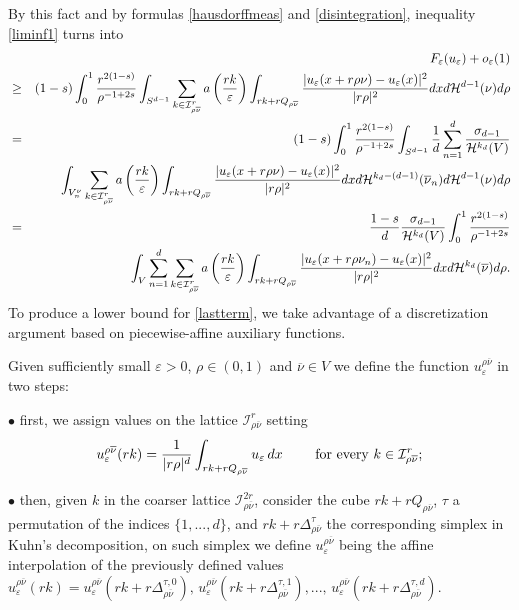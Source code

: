\documentclass[11pt,a4paper,reqno]{amsart}
\theoremstyle{plain}
\theoremstyle{definition}
\newcommand\e{\varepsilon}
\theoremstyle{remark}
\begin{document}
By this fact and by formulas \eqref{hausdorffmeas} and \eqref{disintegration}, inequality \eqref{liminf1} turns into
\begin{eqnarray} && \nonumber
\hskip-0.8cm F_\e(u_\e)+o_\e(1) \\ \nonumber
{\hskip-1.5cm} &\geq&(1-s) \int_0^1 \frac{r^{2(1-s)}}{\rho^{-1+2s}} \int_{S^{d-1}} \sum_{k\in \mathcal{I}^r_{\rho\overline{\nu}}} a\left(\frac{rk}{\e}\right)\int_{rk+rQ_{\rho\overline{\nu}}} \frac{|u_\e(x+r\rho\nu)-u_\e(x)|^2}{|r\rho|^2} dxd\mathcal{H}^{d-1}(\nu) d\rho\\ \nonumber
\hskip-1.5cm&=& (1-s) \int_0^1  \frac{r^{2(1-s)}}{\rho^{-1+2s}} \int_{S^{d-1}} \frac{1}{d} \sum_{n=1}^d \frac{\sigma_{d-1}}{\mathcal{H}^{k_d}(V)} \\ \nonumber
&& \qquad \int_{V_n^\nu} \sum_{k\in \mathcal{I}^r_{\rho \overline{\nu}}} a\left(\frac{rk}{\e}\right)\int_{rk+rQ_{\rho\overline{\nu}}}\frac{|u_\e(x+r\rho\nu)-u_\e(x)|^2}{|r\rho|^2} dx d\mathcal{H}^{k_d-(d-1)}(\overline{\nu}_n) d\mathcal{H}^{d-1}(\nu) d\rho \\ \nonumber
&=& \frac{1-s}{d} \frac{\sigma_{d-1}}{\mathcal{H}^{k_d}(V)} \int_0^1  \frac{r^{2(1-s)}}{\rho^{-1+2s}}  \\ \label{lastterm}
&& \qquad \qquad  \int_V  \sum_{n=1}^d \sum_{k\in \mathcal{I}^r_{\rho \overline{\nu}}}  a\left(\frac{rk}{\e}\right) \int_{rk+rQ_{\rho\overline{\nu}}}\frac{|u_\e(x+r\rho\nu_n)-u_\e(x)|^2}{|r\rho|^2} dx d\mathcal{H}^{k_d}(\overline{\nu}) d\rho.
\end{eqnarray}
To produce a lower bound for \eqref{lastterm}, we take advantage of a discretization argument based on piecewise-affine  auxiliary functions.

Given sufficiently small $\e>0$, $\rho\in (0,1)$ and $\overline{\nu}\in V$ we define the function $u_\e^{\rho\overline{\nu}}$ in two steps:

    $\bullet$ first, we assign values on the lattice $\mathcal{I}^r_{\rho\overline{\nu}}$ setting
    \[
    u_\e^{\rho\overline{\nu}}(rk)= \displaystyle \frac{1}{|r\rho|^d}\int_{rk+rQ_{\rho\overline{\nu}}} u_\e\,dx \qquad \hbox{ for every } k\in \mathcal{I}^r_{\rho\overline{\nu}};
    \] 
    
    $\bullet$ then, given $k$ in the coarser lattice $\mathcal{I}^{2r}_{\rho\overline{\nu}}$, consider the cube $rk+rQ_{\rho\overline{\nu}}$, $\tau$ 
a permutation of the indices $\{1,...,d\}$, and $rk+r\Delta^\tau_{\rho\overline{\nu}}$ the corresponding simplex in Kuhn's decomposition, on such simplex we define $u^{\rho\overline{\nu}}_\e$ being the affine interpolation of the previously defined values $u^{\rho \overline{\nu}}_\e(rk) = u^{\rho \overline{\nu}}_\e(rk+r\Delta^{\tau,0}_{\rho\overline{\nu}}),\, u^{\rho\overline{\nu}}_\e(rk+r\Delta^{\tau, 1}_{\rho\overline{\nu}}),..., \,u^{\rho\overline{\nu}}_\e(rk+r\Delta^{\tau, d}_{\rho\overline{\nu}})$.
\end{document}
